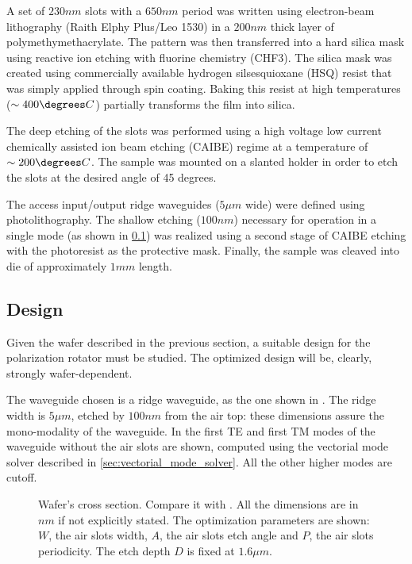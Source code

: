 A set of $230 nm$ slots with a $650 nm$ period was written using
electron-beam lithography (Raith Elphy Plus/Leo 1530) in a $200 nm$
thick layer of polymethymethacrylate. The pattern was then transferred
into a hard silica mask using reactive ion etching with fluorine
chemistry (CHF3). The silica mask was created using commercially
available hydrogen silsesquioxane (HSQ) resist that was simply applied
through spin coating. Baking this resist at high temperatures ($\sim
400\degrees C$) partially transforms the film into silica.

The deep etching of the slots was performed using a high voltage low
current chemically assisted ion beam etching (CAIBE) regime at a
temperature of $\sim 200\degrees C$. The sample was mounted on a slanted
holder in order to etch the slots at the desired angle of 45
degrees.

The access input/output ridge waveguides ($5 \mu m$ wide) were defined
using photolithography. The shallow etching ($100 nm$) necessary for
operation in a single mode (as shown in \ref{sec:polrot_design}) was
realized using a second stage of CAIBE etching with the photoresist as
the protective mask. Finally, the sample was cleaved into die of
approximately $1mm$ length.

\subsection{Design} \label{sec:polrot_design}

Given the wafer described in the previous section, a suitable design
for the polarization rotator must be studied. The optimized design
will be, clearly, strongly wafer-dependent.

The waveguide chosen is a ridge waveguide, as the one shown in
. The ridge width is $5 \mu m$, etched by
$100 nm$ from the air top: these dimensions assure the mono-modality of
the waveguide. In  the first TE and first TM
modes of the waveguide without the air slots are shown, computed using
the vectorial mode solver described in
\ref{sec:vectorial_mode_solver}. All the other higher modes are
cutoff.

\begin{figure}[htbp]
  \begin{center}
    \resizebox{!}{5cm}{}
    \resizebox{!}{5cm}{}
  \end{center}
  \caption{Wafer's cross section. Compare it with
    . All the dimensions are in
    $nm$ if not explicitly stated. The optimization parameters are
    shown: $W$, the air slots width, $A$, the air slots etch angle and
    $P$, the air slots periodicity. The etch depth $D$ is fixed at $1.6
    \mu m$.}
  \label{fig:polrot_wafer}
\end{figure}

